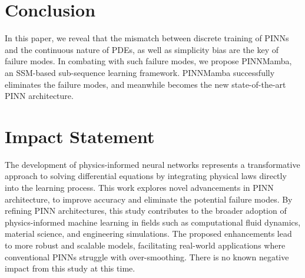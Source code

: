 \vspace{-3mm}
\section{Conclusion}
In this paper, we reveal that the mismatch between discrete training of PINNs and the continuous nature of PDEs, as well as simplicity bias are the key of failure modes. 
    In combating with such failure modes, we propose PINNMamba, an SSM-based sub-sequence learning framework. 
    PINNMamba successfully eliminates the failure modes, and meanwhile becomes the new state-of-the-art PINN architecture.
    
\section*{Impact Statement}

The development of physics-informed neural networks represents a transformative approach to solving differential equations by integrating physical laws directly into the learning process. 
    This work explores novel advancements in PINN architecture, to improve accuracy and eliminate the potential failure modes. 
    By refining PINN architectures, this study contributes to the broader adoption of physics-informed machine learning in fields such as computational fluid dynamics, material science, and engineering simulations. 
        The proposed enhancements lead to more robust and scalable models, facilitating real-world applications where conventional PINNs struggle with over-smoothing. There is no known negative impact from this study at this time.